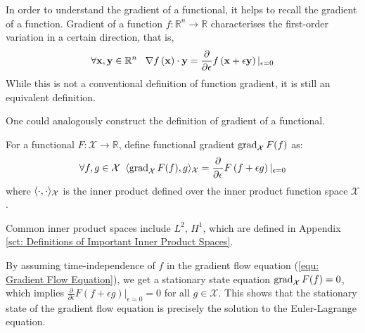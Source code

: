 \documentclass[../dissertation.tex]{subfiles}
\begin{document}
In order to understand the gradient of a functional, it helps to recall the gradient of a function.
Gradient of a function $f:\mathbb{R}^n \rightarrow \mathbb{R}$ characterises the first-order variation in a certain direction,
that is,
\begin{equation}
    \forall \mathbf{x}, \mathbf{y} \in \mathbb{R}^n \; \; \;
    \nabla f \left( \mathbf{x} \right) \cdot \mathbf{y} = \frac{\partial}{\partial \epsilon} f\left( \mathbf{x} + \epsilon \mathbf{y} \right)|_{\epsilon=0}
\end{equation}
While this is not a conventional definition of function gradient, it is still an equivalent definition.

One could analogously construct the definition of gradient of a functional.
\begin{definition}
    For a functional $F:\mathcal{X} \rightarrow \mathbb{R}$, define functional gradient $\operatorname{grad}_{\mathcal{X}} F (f)$ as:
    \begin{equation}
        \forall f, g \in \mathcal{X} \; \; \langle \operatorname{grad}_{\mathcal{X}} F (f), g \rangle_{\mathcal{X}} = \frac{\partial}{\partial \epsilon} F \left( f + \epsilon g \right)|_{\epsilon = 0}
    \end{equation}
    where $\langle \cdot, \cdot \rangle_{\mathcal{X}}$ is the inner product defined over the inner product function space $\mathcal{X}$.
\end{definition}

Common inner product spaces include $L^2$, $H^1$, which are defined in Appendix \ref{sct: Definitions of Important Inner Product Spaces}.

\begin{remark}
    By assuming time-independence of $f$ in the gradient flow equation (\ref{equ: Gradient Flow Equation}), we get a stationary state equation $\operatorname{grad}_{\mathcal{X}} F(f) = 0$,
    which implies $\frac{\partial}{\partial \epsilon} F \left( f + \epsilon g \right)|_{\epsilon=0} = 0$ for all $g \in \mathcal{X}$.
    This shows that the stationary state of the gradient flow equation is precisely the solution to the Euler-Lagrange equation.
\end{remark}
\end{document}
